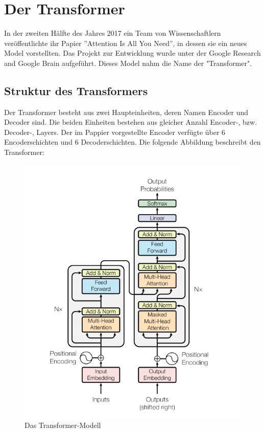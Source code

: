 \chapter{Der Transformer} \label{Transformer}

In der zweiten Hälfte des Jahres 2017 ein Team von Wissenschaftlern veröffentlichte ihr Papier \textquotedblright Attention Is All You Need\textquotedblright, in dessen sie ein neues Model vorstellten. Das Projekt zur Entwicklung wurde unter der Google Research and Google Brain aufgeführt. Dieses Model nahm die Name der "Transformer".

\section{Struktur des Transformers}
Der Transformer besteht aus zwei Haupteinheiten, deren Namen Encoder und Decoder sind. Die beiden Einheiten bestehen aus gleicher Anzahl Encoder-, bzw. Decoder-, Layers. Der im Pappier vorgestellte Encoder verfügte über 6 Encoderschichten und 6 Decoderschichten. Die folgende Abbildung beschreibt den Transformer:


\begin{figure}
	\centering
	\includegraphics[scale=0.36]{images/transformer.png}
	\caption{Das Transformer-Modell}
	\label{transformer}
\end{figure}

